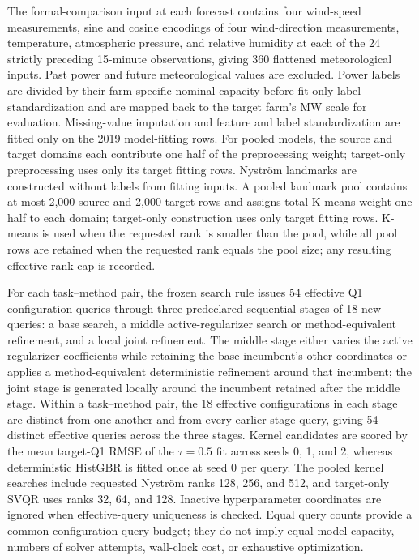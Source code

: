 {\color{blue}The formal-comparison input at each forecast contains four wind-speed measurements, sine and cosine encodings of four wind-direction measurements, temperature, atmospheric pressure, and relative humidity at each of the 24 strictly preceding 15-minute observations, giving 360 flattened meteorological inputs. Past power and future meteorological values are excluded. Power labels are divided by their farm-specific nominal capacity before fit-only label standardization and are mapped back to the target farm's MW scale for evaluation. Missing-value imputation and feature and label standardization are fitted only on the 2019 model-fitting rows. For pooled models, the source and target domains each contribute one half of the preprocessing weight; target-only preprocessing uses only its target fitting rows. Nystr\"om landmarks are constructed without labels from fitting inputs. A pooled landmark pool contains at most 2,000 source and 2,000 target rows and assigns total K-means weight one half to each domain; target-only construction uses only target fitting rows. K-means is used when the requested rank is smaller than the pool, while all pool rows are retained when the requested rank equals the pool size; any resulting effective-rank cap is recorded.}

{\color{blue}For each task--method pair, the frozen search rule issues 54 effective Q1 configuration queries through three predeclared sequential stages of 18 new queries: a base search, a middle active-regularizer search or method-equivalent refinement, and a local joint refinement. The middle stage either varies the active regularizer coefficients while retaining the base incumbent's other coordinates or applies a method-equivalent deterministic refinement around that incumbent; the joint stage is generated locally around the incumbent retained after the middle stage. Within a task--method pair, the 18 effective configurations in each stage are distinct from one another and from every earlier-stage query, giving 54 distinct effective queries across the three stages. Kernel candidates are scored by the mean target-Q1 RMSE of the $\tau=0.5$ fit across seeds 0, 1, and 2, whereas deterministic HistGBR is fitted once at seed 0 per query. The pooled kernel searches include requested Nystr\"om ranks 128, 256, and 512, and target-only SVQR uses ranks 32, 64, and 128. Inactive hyperparameter coordinates are ignored when effective-query uniqueness is checked. Equal query counts provide a common configuration-query budget; they do not imply equal model capacity, numbers of solver attempts, wall-clock cost, or exhaustive optimization.}

